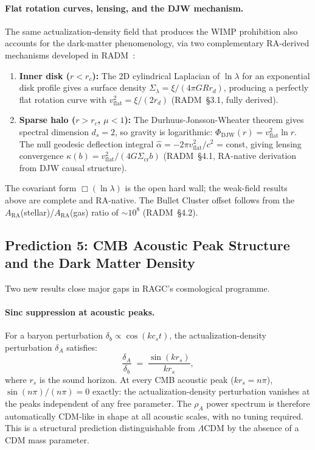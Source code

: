 \documentclass[11pt,a4paper]{article}
\theoremstyle{plain}
\theoremstyle{definition}
\theoremstyle{remark}
\begin{document}
\paragraph{Flat rotation curves, lensing, and the DJW mechanism.}
The same actualization-density field that produces the WIMP prohibition also
accounts for the dark-matter phenomenology, via two complementary RA-derived
mechanisms developed in RADM~\citep{Sandeman2026RADM}:
\begin{enumerate}[noitemsep]
  \item \textbf{Inner disk ($r < r_c$):} The 2D cylindrical Laplacian of
  $\ln\lambda$ for an exponential disk profile gives a surface density
  $\Sigma_\lambda = \xi/(4\pi G R r_d)$, producing a perfectly flat rotation
  curve with $v_\mathrm{flat}^2 = \xi/(2r_d)$ (RADM~\S3.1, fully derived).
  \item \textbf{Sparse halo ($r > r_c$, $\mu < 1$):} The Durhuus-Jonsson-Wheater
  theorem gives spectral dimension $d_s = 2$, so gravity is logarithmic:
  $\Phi_\mathrm{DJW}(r) = v_\mathrm{flat}^2\ln r$. The null geodesic
  deflection integral $\hat\alpha = -2\pi v_\mathrm{flat}^2/c^2$ = const,
  giving lensing convergence $\kappa(b) = v_\mathrm{flat}^2/(4G\Sigma_\mathrm{cr}b)$
  (RADM~\S4.1, RA-native derivation from DJW causal structure).
\end{enumerate}
The covariant form $\Box(\ln\lambda)$ is the open hard wall; the weak-field
results above are complete and RA-native. The Bullet Cluster offset follows
from the $A_\mathrm{RA}$(stellar)/$ A_\mathrm{RA}$(gas) ratio of $\sim 10^8$
(RADM~\S4.2).

\subsection{Prediction 5: CMB Acoustic Peak Structure and the Dark Matter Density}
\label{sec:pred5}

Two new results close major gaps in RAGC's cosmological programme.

\paragraph{Sinc suppression at acoustic peaks.}
For a baryon perturbation $\delta_b \propto \cos(k c_s t)$, the
actualization-density perturbation $\delta_A$ satisfies:
\begin{equation}
  \frac{\delta_A}{\delta_b} \;=\; \frac{\sin(k r_s)}{k r_s},
  \label{eq:sinc_pred5}
\end{equation}
where $r_s$ is the sound horizon.  At every CMB acoustic peak
($k r_s = n\pi$), $\sin(n\pi)/(n\pi) = 0$ exactly: the actualization-density
perturbation vanishes at the peaks independent of any free parameter.
The $\rho_A$ power spectrum is therefore automatically CDM-like in shape at
all acoustic scales, with no tuning required.  This is a structural prediction
distinguishable from $\Lambda$CDM by the absence of a CDM mass parameter.
\end{document}
